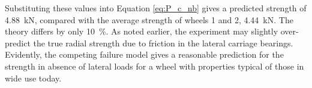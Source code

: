 \documentclass[\rootdir/thesis.tex]{subfiles}
\begin{document}








Substituting these values into Equation \eqref{eq:P_c_nb} gives a predicted strength of \SI{4.88}{kN}, compared with the average strength of wheels 1 and 2, \SI{4.44}{kN}. The theory differs by only \SI{10}{\percent}. As noted earlier, the experiment may slightly over-predict the true radial strength due to friction in the lateral carriage bearings. Evidently, the competing failure model gives a reasonable prediction for the strength in absence of lateral loads for a wheel with properties typical of those in wide use today.
\end{document}
